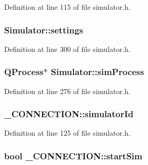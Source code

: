 \-Definition at line 115 of file simulator.\-h.

\hypertarget{group___h_i_t_l_plugin_ga61775246e91fbe43ce9d79c03bfde19f}{
\subsubsection[{settings}]{ {\bf \-Simulator\-::settings}}}\label{group___h_i_t_l_plugin_ga61775246e91fbe43ce9d79c03bfde19f}


\-Definition at line 300 of file simulator.\-h.

\hypertarget{group___h_i_t_l_plugin_ga28f5833f779eb659394e6c6cfe6f2331}{
\subsubsection[{sim\-Process}]{\setlength{\rightskip}{0pt plus 5cm}\-Q\-Process$\ast$ {\bf \-Simulator\-::sim\-Process}}}\label{group___h_i_t_l_plugin_ga28f5833f779eb659394e6c6cfe6f2331}


\-Definition at line 276 of file simulator.\-h.

\hypertarget{group___h_i_t_l_plugin_gae2769b70fdfc601ee4d7fc19c08bfe59}{
\subsubsection[{simulator\-Id}]{ {\bf \-\_\-\-C\-O\-N\-N\-E\-C\-T\-I\-O\-N\-::simulator\-Id}}}\label{group___h_i_t_l_plugin_gae2769b70fdfc601ee4d7fc19c08bfe59}


\-Definition at line 125 of file simulator.\-h.

\hypertarget{group___h_i_t_l_plugin_ga17c6b00bf3f43c686cca76b3286ba75c}{
\subsubsection[{start\-Sim}]{\setlength{\rightskip}{0pt plus 5cm}bool {\bf \-\_\-\-C\-O\-N\-N\-E\-C\-T\-I\-O\-N\-::start\-Sim}}}\label{group___h_i_t_l_plugin_ga17c6b00bf3f43c686cca76b3286ba75c}


